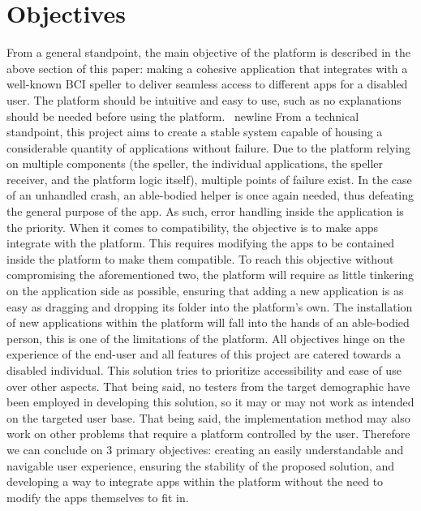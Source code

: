 \section{Objectives}\label{sect:objectives}
From a general standpoint, the main objective of the platform is described in the above section of this paper: making a cohesive application that integrates with a well-known BCI speller to deliver seamless access to different apps for a disabled user. The platform should be intuitive and easy to use, such as no explanations should be needed before using the platform. 
\vspace{\baselineskip}\ newline 
From a technical standpoint, this project aims to create a stable system capable of housing a considerable quantity of applications without failure. Due to the platform relying on multiple components (the speller, the individual applications, the speller receiver, and the platform logic itself), multiple points of failure exist. In the case of an unhandled crash, an able-bodied helper is once again needed, thus defeating the general purpose of the app. As such, error handling inside the application is the priority. 
\vspace{\baselineskip}\newline
When it comes to compatibility, the objective is to make apps integrate with the platform. This requires modifying the apps to be contained inside the platform to make them compatible. To reach this objective without compromising the aforementioned two, the platform will require as little tinkering on the application side as possible, ensuring that adding a new application is as easy as dragging and dropping its folder into the platform's own. The installation of new applications within the platform will fall into the hands of an able-bodied person, this is one of the limitations of the platform. 
\vspace{\baselineskip}\newline
All objectives hinge on the experience of the end-user and all features of this project are catered towards a disabled individual. This solution tries to prioritize accessibility and ease of use over other aspects. That being said, no testers from the target demographic have been employed in developing this solution, so it may or may not work as intended on the targeted user base. That being said, the implementation method may also work on other problems that require a platform controlled by the user.
\vspace{\baselineskip}\newline
Therefore we can conclude on 3 primary objectives: creating an easily understandable and navigable user experience, ensuring the stability of the proposed solution, and developing a way to integrate apps within the platform without the need to modify the apps themselves to fit in.



